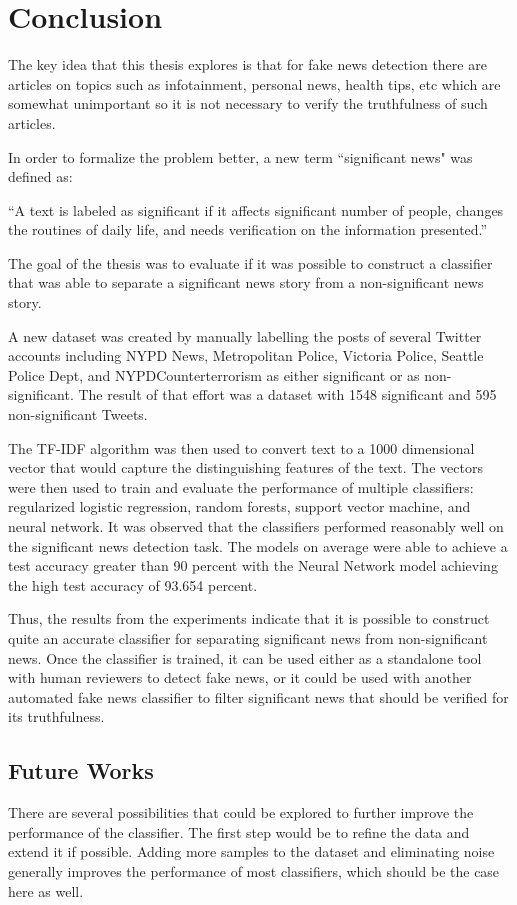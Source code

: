 \chapter{Conclusion}\label{conclusion}
The key idea that this thesis explores is that for fake news detection there are articles on topics such as infotainment, personal news, health tips, etc which are somewhat unimportant so it is not necessary to verify the truthfulness of such articles.

In order to formalize the problem better, a new term ``significant news" was defined as:

\enquote{A text is labeled as significant if it affects significant number of people, changes the routines of daily life, and needs verification on the information presented.}

The goal of the thesis was to evaluate if it was possible to construct a classifier that was able to separate a significant news story from a non-significant news story.

A new dataset was created by manually labelling the posts of several Twitter accounts including NYPD News, Metropolitan Police, Victoria Police, Seattle Police Dept, and NYPDCounterterrorism as either significant or as non-significant. The result of that effort was a dataset with 1548 significant and 595 non-significant Tweets.

The TF-IDF algorithm was then used to convert text to a 1000 dimensional vector that would capture the distinguishing features of the text. The vectors were then used to train and evaluate the performance of multiple classifiers: regularized logistic regression, random forests, support vector machine, and neural network. It was observed that the classifiers performed reasonably well on the significant news detection task. The models on average were able to achieve a test accuracy greater than 90 percent with the Neural Network model achieving the high test accuracy of 93.654 percent.

Thus, the results from the experiments indicate that it is possible to construct quite an accurate classifier for separating significant news from non-significant news. Once the classifier is trained, it can be used either as a standalone tool with human reviewers to detect fake news, or it could be used with another automated fake news classifier to filter significant news that should be verified for its truthfulness.

\section{Future Works}
There are several possibilities that could be explored to further improve the performance of the classifier. The first step would be to refine the data and extend it if possible. Adding more samples to the dataset and eliminating noise generally improves the performance of most classifiers, which should be the case here as well.

